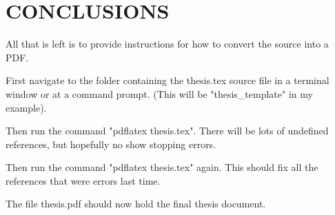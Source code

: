 \chapter{CONCLUSIONS}

All that is left is to provide instructions for how to convert the source into a PDF.

First navigate to the folder containing the thesis.tex source file in a terminal window
or at a command prompt.  (This will be "thesis\_template" in my example).

Then run the command "pdflatex thesis.tex".  There will be lots of undefined references, but hopefully
no show stopping errors.

Then run the command "pdflatex thesis.tex" again.  This should fix all the references that
were errors last time.

The file thesis.pdf should now hold the final thesis document.
